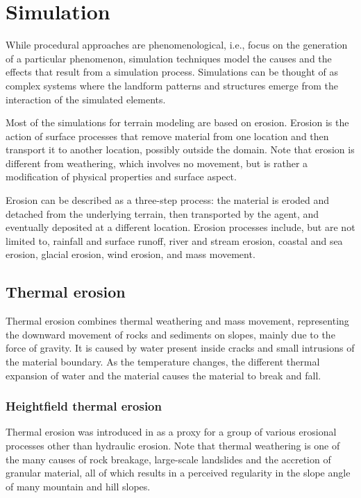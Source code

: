 \documentclass{article}
\begin{document}
\section{Simulation}

While procedural approaches are phenomenological, i.e., focus on the generation of a particular phenomenon, simulation techniques model the causes and the effects that result from a simulation process. Simulations can be thought of as complex systems where the landform patterns and structures emerge from the interaction of the simulated elements.

Most of the simulations for terrain modeling are based on erosion. Erosion is the action of surface processes that remove material from one location and then transport it to another location, possibly outside the domain. Note that erosion is different from weathering, which involves no movement, but is rather a modification of physical properties and surface aspect.

Erosion can be described as a three-step process: the material is eroded and detached from the underlying terrain, then transported by the agent, and eventually deposited at a different location. Erosion processes include, but are not limited to, rainfall and surface runoff, river and stream erosion, coastal and sea erosion, glacial erosion, wind erosion, and mass movement.

\subsection{Thermal erosion}

Thermal erosion combines thermal weathering and mass movement, representing the downward movement of rocks and sediments on slopes, mainly due to the force of gravity. It is caused by water present inside cracks and small intrusions of the material boundary. As the temperature changes, the different thermal expansion of water and the material causes the material to break and fall.

\subsubsection{Heightfield thermal erosion}

Thermal erosion was introduced in \cite{MKM89} as a proxy for a group of various erosional processes other than hydraulic erosion. Note that thermal weathering is one of the many causes of rock breakage, large-scale landslides and the accretion of granular material, all of which results in a perceived regularity in the slope angle of many mountain and hill slopes.
\end{document}
